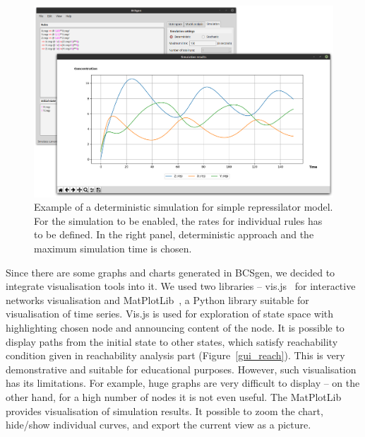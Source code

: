 \documentclass[12pt]{fithesis2}
\begin{document}
\begin{figure}[!h]
\begin{center}
\includegraphics[scale=0.23]{pics/BCSgen_simulation}
\caption{Example of a deterministic simulation for simple repressilator model. For the simulation to be enabled, the rates for individual rules has to be defined. In the right panel, deterministic approach and the maximum simulation time is chosen.}\label{gui_simulation}
\end{center}
\end{figure}

Since there are some graphs and charts generated in BCSgen, we decided to integrate visualisation tools into it. We used two libraries -- vis.js~\cite{almende2016vis} for interactive networks visualisation and MatPlotLib~\cite{hunter2007matplotlib}, a Python library suitable for visualisation of time series. Vis.js is used for exploration of state space with highlighting chosen node and announcing content of the node. It is possible to display paths from the initial state to other states, which satisfy reachability condition given in reachability analysis part (Figure~\ref{gui_reach}). This is very demonstrative and suitable for educational purposes. However, such visualisation has its limitations. For example, huge graphs are very difficult to display -- on the other hand, for a high number of nodes it is not even useful. The MatPlotLib provides visualisation of simulation results. It possible to zoom the chart, hide/show individual curves, and export the current view as a picture.
\end{document}
